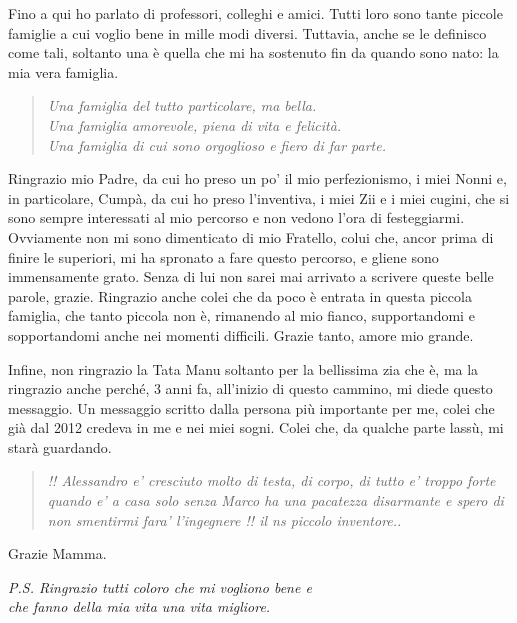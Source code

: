 Fino a qui ho parlato di professori, colleghi e amici. Tutti loro sono tante piccole famiglie a cui voglio bene in mille modi diversi.
Tuttavia, anche se le definisco come tali, soltanto una è quella che mi ha sostenuto fin da quando sono nato: la mia vera famiglia.
\begin{quote}
\textit{Una famiglia del tutto particolare, ma bella.\\
Una famiglia amorevole, piena di vita e felicità.\\
Una famiglia di cui sono orgoglioso e fiero di far parte.}
\end{quote}
Ringrazio mio Padre, da cui ho preso un po' il mio perfezionismo, i miei Nonni e, in particolare, Cumpà, da cui ho preso l'inventiva, i miei Zii e i miei cugini, che si sono sempre interessati al mio percorso e non vedono l'ora di festeggiarmi.
Ovviamente non mi sono dimenticato di mio Fratello, colui che, ancor prima di finire le superiori, mi ha spronato a fare questo percorso, e gliene sono immensamente grato. Senza di lui non sarei mai arrivato a scrivere queste belle parole, grazie.
Ringrazio anche colei che da poco è entrata in questa piccola famiglia, che tanto piccola non è, rimanendo al mio fianco, supportandomi e sopportandomi anche nei momenti difficili. Grazie tanto, amore mio grande.

Infine, non ringrazio la Tata Manu soltanto per la bellissima zia che è, ma la ringrazio anche perché, 3 anni fa, all'inizio di questo cammino, mi diede questo messaggio.
Un messaggio scritto dalla persona più importante per me, colei che già dal 2012 credeva in me e nei miei sogni. Colei che, da qualche parte lassù, mi starà guardando.
\begin{quote}
    \textit{!! Alessandro e' cresciuto molto di testa, di corpo, di tutto e' troppo forte quando e' a casa solo senza Marco ha una pacatezza disarmante e spero di non smentirmi fara' l'ingegnere !! il ns piccolo inventore..}
\end{quote}
Grazie Mamma.

\vspace{2cm}

\noindent
\textit{P.S. Ringrazio tutti coloro che mi vogliono bene e\\ che fanno della mia vita una vita migliore.}